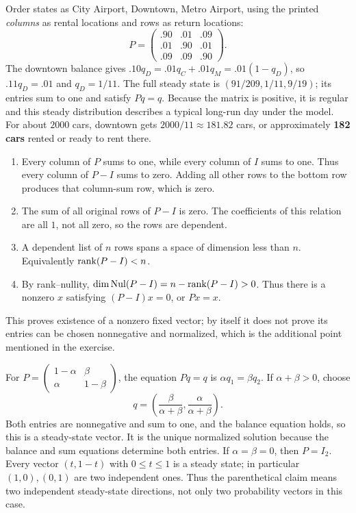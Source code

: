 Order states as City Airport, Downtown, Metro Airport, using the printed
\emph{columns} as rental locations and rows as return locations:
\[
 P=\begin{pmatrix}.90&.01&.09\\.01&.90&.01\\.09&.09&.90\end{pmatrix}.
\]
The downtown balance gives $.10q_D=.01q_C+.01q_M=.01(1-q_D)$,
so $.11q_D=.01$ and $q_D=1/11$.
The full steady state is $(91/209,1/11,9/19)$; its entries sum to one and
satisfy $Pq=q$. Because the matrix is positive, it is regular and this
steady distribution describes a typical long-run day under the model.
For about $2000$ cars, downtown gets $2000/11\approx181.82$ cars,
or approximately \textbf{182 cars} rented or ready to rent there.

\begin{enumerate}[label=(\alph*)]
\item Every column of $P$ sums to one, while every column of $I$ sums
to one. Thus every column of $P-I$ sums to zero. Adding all other rows
to the bottom row produces that column-sum row, which is zero.
\item The sum of all original rows of $P-I$ is zero. The coefficients
of this relation are all $1$, not all zero, so the rows are dependent.
\item A dependent list of $n$ rows spans a space of dimension less than $n$.
Equivalently $\operatorname{rank}(P-I)<n$.
\item By rank--nullity, $\dim\operatorname{Nul}(P-I)=n-\operatorname{rank}(P-I)>0$.
Thus there is a nonzero $x$ satisfying $(P-I)x=0$, or $Px=x$.
\end{enumerate}
This proves existence of a nonzero fixed vector; by itself it does not
prove its entries can be chosen nonnegative and normalized, which is the
additional point mentioned in the exercise.

For $P=\left(\begin{smallmatrix}1-\alpha&\beta\\\alpha&1-\beta\end{smallmatrix}\right)$,
the equation $Pq=q$ is $\alpha q_1=\beta q_2$.
If $\alpha+\beta>0$, choose
\[
 q=\left(\frac{\beta}{\alpha+\beta},
          \frac{\alpha}{\alpha+\beta}\right).
\]
Both entries are nonnegative and sum to one, and the balance equation
holds, so this is a steady-state vector. It is the unique normalized
solution because the balance and sum equations determine both entries.
If $\alpha=\beta=0$, then $P=I_2$. Every vector $(t,1-t)$ with
$0\le t\le1$ is a steady state; in particular $(1,0),(0,1)$ are two
independent ones. Thus the parenthetical claim means two independent
steady-state directions, not only two probability vectors in this case.

